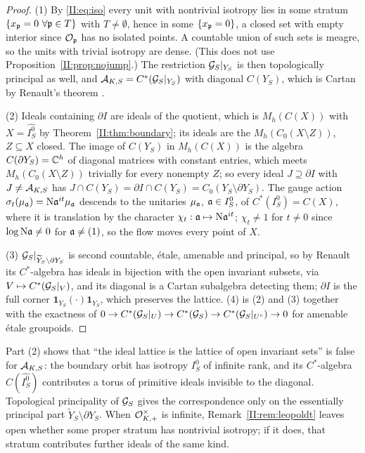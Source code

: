 \begin{proof}
(1) By \eqref{II:eq:iso} every unit with nontrivial isotropy lies in some stratum
$\{x_{\mathfrak{p}}=0\ \forall\mathfrak{p}\in T\}$ with $T\ne\emptyset$, hence in some $\{x_{\mathfrak{p}}=0\}$, a closed set
with empty interior since $\mathcal{O}_{\mathfrak{p}}$ has no isolated points. A countable union of such sets
is meagre, so the units with trivial isotropy are dense. (This does not use
Proposition~\ref{II:prop:nojump}.) The restriction $\mathcal{G}_S|_{Y_S}$ is then topologically
principal as well, and $\mathcal{A}_{K,S}=C^*(\mathcal{G}_S|_{Y_S})$ with diagonal $C(Y_S)$, which is Cartan
by Renault's theorem \cite{Renault08}.

(2) Ideals containing $\partial I$ are ideals of the quotient, which is $M_h(C(X))$ with
$X=\widehat{I_S^0}$ by Theorem~\ref{II:thm:boundary}; its ideals are the $M_h(C_0(X\setminus Z))$,
$Z\subseteq X$ closed. The image of $C(Y_S)$ in $M_h(C(X))$ is the algebra
$C(\partial Y_S)=\mathbb{C}^h$ of diagonal matrices with constant entries, which meets
$M_h(C_0(X\setminus Z))$ trivially for every nonempty $Z$; so every ideal $J\supseteq\partial I$
with $J\ne\mathcal{A}_{K,S}$ has $J\cap C(Y_S)=\partial I\cap C(Y_S)=C_0(Y_S\setminus\partial Y_S)$.
The gauge action $\sigma_t(\mu_{\mathfrak{a}})=\mathrm{N}\mathfrak{a}^{it}\mu_{\mathfrak{a}}$ descends to the unitaries
$\mu_{\mathfrak{a}}$, $\mathfrak{a}\in I_S^0$, of $C^*(I_S^0)=C(X)$, where it is translation by the character
$\chi_t:\mathfrak{a}\mapsto\mathrm{N}\mathfrak{a}^{it}$; $\chi_t\ne1$ for $t\ne0$ since $\log\mathrm{N}\mathfrak{a}\ne0$ for
$\mathfrak{a}\ne(1)$, so the flow moves every point of $X$.

(3) $\mathcal{G}_S|_{\widetilde Y_S\setminus\partial Y_S}$ is second countable, \'etale, amenable and
principal, so by Renault \cite{Renault} its $C^*$-algebra has ideals in bijection with the
open invariant subsets, via $V\mapsto C^*(\mathcal{G}_S|_V)$, and its diagonal is a Cartan
subalgebra detecting them; $\partial I$ is the full corner $\mathbf 1_{Y_S}(\cdot)\mathbf 1_{Y_S}$,
which preserves the lattice. (4) is (2) and (3) together with the exactness of
$0\to C^*(\mathcal{G}_S|_U)\to C^*(\mathcal{G}_S)\to C^*(\mathcal{G}_S|_{U^c})\to0$ for amenable \'etale groupoids.
\end{proof}

\begin{remark}\label{II:rem:lattice}
Part (2) shows that ``the ideal lattice is the lattice of open invariant sets'' is false
for $\mathcal{A}_{K,S}$: the boundary orbit has isotropy $I_S^0$ of infinite rank, and its
$C^*$-algebra $C(\widehat{I_S^0})$ contributes a torus of primitive ideals invisible to the
diagonal. Topological principality of $\mathcal{G}_S$ gives the correspondence only on the
essentially principal part $\widetilde Y_S\setminus\partial Y_S$. When $\mathcal{O}^\times_{K,+}$ is
infinite, Remark~\ref{II:rem:leopoldt} leaves open whether some proper stratum has nontrivial
isotropy; if it does, that stratum contributes further ideals of the same kind.
\end{remark}

